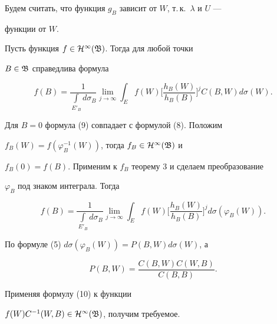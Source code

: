 Будем считать, что функция $g_B$ зависит от $W$, т.\,к.~$\lambda$ и $U$ --- 


функции от $W$. 


 


\begin{thm} 


Пусть функция $f\in\cal H^1(\frak B)$. Тогда для любой точки 


$B\in\frak B$ справедлива формула 


\begin{equation} 


f(B)=\frac{1}{\int\limits_{E'_B}d\sigma_B}\lim_{j\to\infty} 


\int_E f(W)\bigg[\frac{h_B(W)}{h_B(B)}\bigg]^j 


C(B,W)d\sigma(W). 


\end{equation} 


\end{thm} 


 


\begin{pf} 


Для $B=0$ формула (9) совпадает с формулой (8). Положим 


$f_B(W)=f(\varphi^{-1}_B(W))$, тогда $f_B\in\cal H^1(\frak B)$ и 


$f_B(0)=f(B)$. Применим к $f_B$ теорему 3 и сделаем преобразование 


$\varphi_B$ под знаком интеграла. Тогда 


\begin{equation} 


f(B)=\frac{1}{\int\limits_{E'_B}d\sigma_B}\lim_{j\to\infty} 


\int_E f(W)\bigg[\frac{h_B(W)}{h_B(B)}\bigg]^j 


d\sigma(\varphi_B(W)). 


\end{equation} 


По формуле (5)\; $d\sigma(\varphi_B(W))=P(B,W)d\sigma(W)$, а 


$$ 


P(B,W)=\frac{C(B,W)C(W,B)}{C(B,B)}. 


$$ 


Применяя формулу (10) к функции 


$f(W)C^{-1}(W,B)\in\cal H^1(\frak B)$, получим требуемое. 


\end{pf} 


